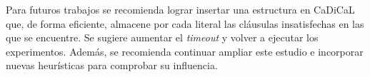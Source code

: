 \begin{recomendations}
Para futuros trabajos se recomienda lograr insertar una estructura en CaDiCaL que, de forma eficiente, almacene por cada literal las cl\'ausulas insatisfechas en las que se encuentre. Se sugiere aumentar el \textit{timeout} y volver a ejecutar los experimentos. Adem\'as, se recomienda continuar ampliar este estudio e incorporar nuevas heurísticas para comprobar su influencia.
\end{recomendations}
